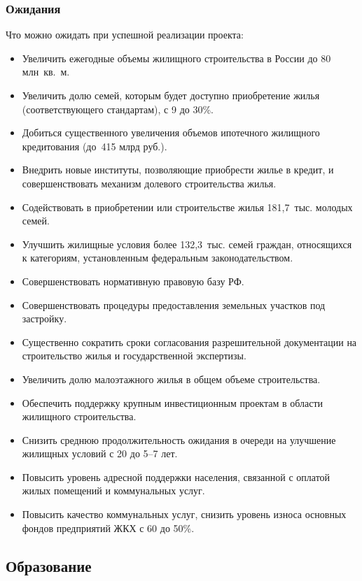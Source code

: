 \documentclass[article, 12pt, russian, oneside]{ncc}
\begin{document}
\subsubsection{Ожидания}

Что можно ожидать при успешной реализации проекта:

\begin{itemize}
\item Увеличить ежегодные объемы жилищного строительства в России до
  80 млн~кв.~м.
\item Увеличить долю семей, которым будет доступно приобретение жилья
  (соответствующего стандартам), с 9 до 30\%.
\item Добиться существенного увеличения объемов ипотечного жилищного
  кредитования (до~415 млрд руб.).
\item Внедрить новые институты, позволяющие приобрести жилье в кредит,
  и совершенствовать механизм долевого строительства жилья.
\item Содействовать в приобретении или строительстве жилья
  181,7~тыс. молодых семей.
\item Улучшить жилищные условия более 132,3~тыс. семей граждан,
  относящихся к категориям, установленным федеральным
  законодательством.
\item Совершенствовать нормативную правовую базу РФ.
\item Совершенствовать процедуры предоставления земельных участков под
  застройку.
\item Существенно сократить сроки согласования разрешительной
  документации на строительство жилья и государственной экспертизы.
\item Увеличить долю малоэтажного жилья в общем объеме строительства.
\item Обеспечить поддержку крупным инвестиционным проектам в области
  жилищного строительства.
\item Снизить среднюю продолжительность ожидания в очереди на
  улучшение жилищных условий с 20 до 5--7 лет.
\item Повысить уровень адресной поддержки населения, связанной с
  оплатой жилых помещений и коммунальных услуг.
\item Повысить качество коммунальных услуг, снизить уровень износа
  основных фондов предприятий ЖКХ с 60 до 50\%.
\end{itemize}

\subsection{Образование}
\end{document}
